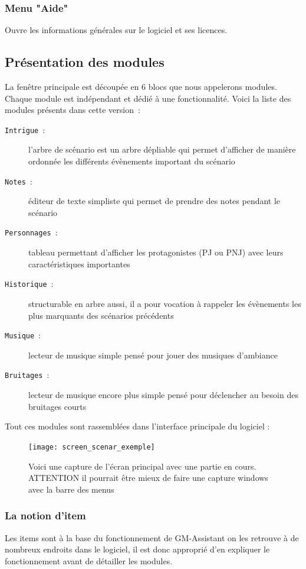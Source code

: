 \documentclass[a4paper,12pt]{article}
\newcommand*{\GMA}{GM-Assistant\xspace}
\newcommand*{\interfaceitem}[1]{\texttt{#1}}
\newcommand*{\guillemets}[1]{\og #1\fg{}\xspace}
\begin{document}
\subsubsection{Menu "Aide"} Ouvre les informations générales sur le logiciel et ses licences.

\subsection{Présentation des modules}\label{modules}
\label{sec:modules}

La fenêtre principale est découpée en 6 blocs que nous appelerons modules.
Chaque module est indépendant et dédié à une fonctionnalité.
Voici la liste des modules présents dans cette version~:
\begin{description}
    \item[\interfaceitem{Intrigue}~:]{l'arbre de scénario est un arbre \guillemets{dépliable} qui permet d'afficher de manière ordonnée les différents évènements important du scénario}
    \item[\interfaceitem{Notes}~:]{éditeur de texte simpliste qui permet de prendre des notes pendant le scénario}
    \item[\interfaceitem{Personnages}~:]{tableau permettant d'afficher les protagonistes (PJ ou PNJ) avec leurs caractéristiques importantes}
    \item[\interfaceitem{Historique}~:]{structurable en arbre aussi, il a pour vocation à rappeler les évènements les plus marquants des scénarios précédents}
    \item[\interfaceitem{Musique}~:]{lecteur de musique simple pensé pour jouer des musiques d'ambiance}
    \item[\interfaceitem{Bruitages}~:]{lecteur de musique encore plus simple pensé pour déclencher au besoin des bruitages courts}
\end{description}
Tout ces modules sont rassemblées dans l'interface principale du logiciel :
\begin{figure}[h]
    \texttt{[image: screen\_scenar\_exemple]}
    \caption{Voici une capture de l'écran principal avec une partie en cours.
    ATTENTION il pourrait être mieux de faire une capture windows avec la barre des menus}
\end{figure}


\subsubsection{La notion d'item}\label{item}
Les items sont à la base du fonctionnement de \GMA on les retrouve à de nombreux endroits dans le logiciel, il est donc approprié d'en expliquer le fonctionnement avant de détailler les modules.
\end{document}

